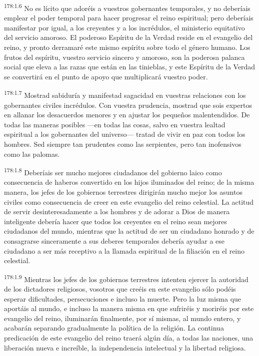 \par 
\textsuperscript{178:1.6} No es lícito que adoréis a vuestros gobernantes temporales, y no deberíais emplear el poder temporal para hacer progresar el reino espiritual; pero deberíais manifestar por igual, a los creyentes y a los incrédulos, el ministerio equitativo del servicio amoroso. El poderoso Espíritu de la Verdad reside en el evangelio del reino, y pronto derramaré este mismo espíritu sobre todo el género humano. Los frutos del espíritu, vuestro servicio sincero y amoroso, son la poderosa palanca social que eleva a las razas que están en las tinieblas, y este Espíritu de la Verdad se convertirá en el punto de apoyo que multiplicará vuestro poder.

\par 
\textsuperscript{178:1.7} Mostrad sabiduría y manifestad sagacidad en vuestras relaciones con los gobernantes civiles incrédulos. Con vuestra prudencia, mostrad que sois expertos en allanar los desacuerdos menores y en ajustar los pequeños malentendidos. De todas las maneras posibles ---en todas las cosas, salvo en vuestra lealtad espiritual a los gobernantes del universo--- tratad de vivir en paz con todos los hombres. Sed siempre tan prudentes como las serpientes, pero tan inofensivos como las palomas.

\par 
\textsuperscript{178:1.8} Deberíais ser mucho mejores ciudadanos del gobierno laico como consecuencia de haberos convertido en los hijos iluminados del reino; de la misma manera, los jefes de los gobiernos terrestres dirigirán mucho mejor los asuntos civiles como consecuencia de creer en este evangelio del reino celestial. La actitud de servir desinteresadamente a los hombres y de adorar a Dios de manera inteligente debería hacer que todos los creyentes en el reino sean mejores ciudadanos del mundo, mientras que la actitud de ser un ciudadano honrado y de consagrarse sinceramente a sus deberes temporales debería ayudar a ese ciudadano a ser más receptivo a la llamada espiritual de la filiación en el reino celestial.

\par 
\textsuperscript{178:1.9} Mientras los jefes de los gobiernos terrestres intenten ejercer la autoridad de los dictadores religiosos, vosotros que creéis en este evangelio sólo podéis esperar dificultades, persecuciones e incluso la muerte. Pero la luz misma que aportáis al mundo, e incluso la manera misma en que sufriréis y moriréis por este evangelio del reino, iluminarán finalmente, por sí mismas, al mundo entero, y acabarán separando gradualmente la política de la religión. La continua predicación de este evangelio del reino traerá algún día, a todas las naciones, una liberación nueva e increíble, la independencia intelectual y la libertad religiosa.

